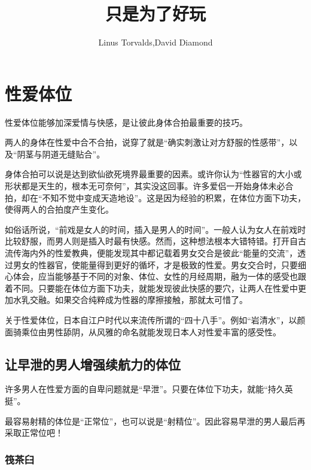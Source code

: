 \documentclass[12pt,UTF8]{ctexbook}
\title{\heiti\zihao{0} 只是为了好玩}
\author{Linus Torvalds,David Diamond}
\date{}
\begin{document}
\maketitle
\tableofcontents

\frontmatter

\chapter{}



\mainmatter

\chapter{性爱体位}

性爱体位能够加深爱情与快感，是让彼此身体合拍最重要的技巧。

两人的身体在性爱中合不合拍，说穿了就是“确实刺激让对方舒服的性感带”，以及“阴茎与阴道无缝贴合”。

身体合拍可以说是达到欲仙欲死境界最重要的因素。或许你认为“性器官的大小或形状都是天生的，根本无可奈何”，其实没这回事。许多爱侣一开始身体未必合拍，却在“不知不觉中变成天造地设”。这是因为经验的积累，在体位方面下功夫，使得两人的合拍度产生变化。

如俗话所说，“前戏是女人的时间，插入是男人的时间”。一般人认为女人在前戏时比较舒服，而男人则是插入时最有快感。然而，这种想法根本大错特错。打开自古流传海内外的性爱教典，便能发现其中都记载着男女交合是彼此“能量的交流”，透过男女的性器官，使能量得到更好的循坏，才是极致的性爱。男女交合时，只要细心体会，应当能够基于不同的对象、体位、女性的月经周期，融为一体的感受也跟着不同。只要能在体位方面下功夫，就能发现彼此快感的要穴，让两人在性爱中更加水乳交融。如果交合纯粹成为性器的摩擦接触，那就太可惜了。

关于性爱体位，日本自江户时代以来流传所谓的“四十八手”。例如“岩清水”，以颜面骑乘位由男性舔阴，从风雅的命名就能发现日本人对性爱丰富的感受性。

\section{让早泄的男人增强续航力的体位}

许多男人在性爱方面的自卑问题就是“早泄”。只要在体位下功夫，就能“持久英挺”。

最容易射精的体位是“正常位”，也可以说是“射精位”。因此容易早泄的男人最后再采取正常位吧！

\subsection{筏茶臼}
\end{document}
